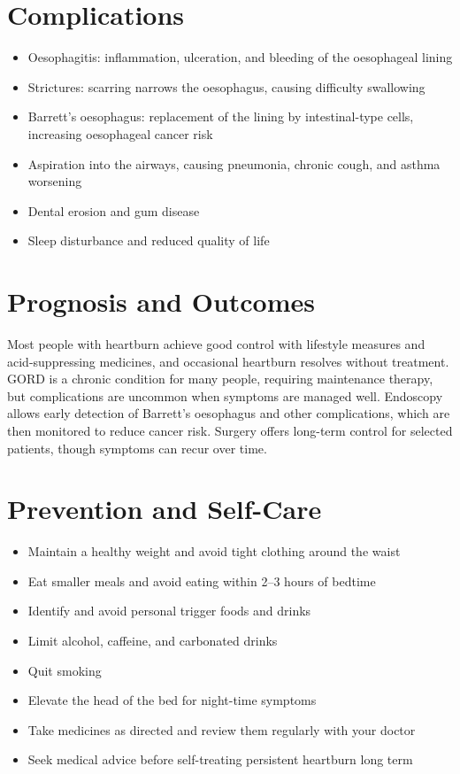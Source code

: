 \section*{Complications}
\begin{itemize}
    \item Oesophagitis: inflammation, ulceration, and bleeding of the oesophageal lining
    \item Strictures: scarring narrows the oesophagus, causing difficulty swallowing
    \item Barrett's oesophagus: replacement of the lining by intestinal-type cells, increasing oesophageal cancer risk
    \item Aspiration into the airways, causing pneumonia, chronic cough, and asthma worsening
    \item Dental erosion and gum disease
    \item Sleep disturbance and reduced quality of life
\end{itemize}

\section*{Prognosis and Outcomes}
Most people with heartburn achieve good control with lifestyle measures and acid-suppressing medicines, and occasional heartburn resolves without treatment. GORD is a chronic condition for many people, requiring maintenance therapy, but complications are uncommon when symptoms are managed well. Endoscopy allows early detection of Barrett's oesophagus and other complications, which are then monitored to reduce cancer risk. Surgery offers long-term control for selected patients, though symptoms can recur over time.

\section*{Prevention and Self-Care}
\begin{itemize}
    \item Maintain a healthy weight and avoid tight clothing around the waist
    \item Eat smaller meals and avoid eating within 2--3 hours of bedtime
    \item Identify and avoid personal trigger foods and drinks
    \item Limit alcohol, caffeine, and carbonated drinks
    \item Quit smoking
    \item Elevate the head of the bed for night-time symptoms
    \item Take medicines as directed and review them regularly with your doctor
    \item Seek medical advice before self-treating persistent heartburn long term
\end{itemize}

